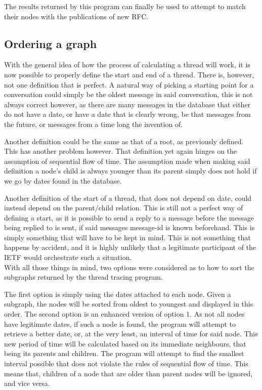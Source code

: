 \documentclass[a4paper,english]{report}
\begin{document}
The results returned by this program can finally be used to attempt to match their nodes with the publications of new RFC.\\

\subsection{Ordering a graph}

With the general idea of how the process of calculating a thread will work, it is now possible to properly define the start and end of a thread. There is, however, not one definition that is perfect. A natural way of picking a starting point for a conversation could simply be the oldest message in said conversation, this is not always correct however, as there are many messages in the database that either do not have a date, or have a date that is clearly wrong, be that messages from the future, or messages from a time long the invention of.

Another definition could be the same as that of a root, as previously defined. This has another problem however. That definition yet again hinges on the assumption of sequential flow of time. The assumption made when making said definition a node's child is always younger than its parent simply does not hold if we go by dates found in the database.

Another definition of the start of a thread, that does not depend on date, could instead depend on the parent/child relation. This is still not a perfect way of defining a start, as it is possible to send a reply to a message before the message being replied to is sent, if said messages message-id is known beforehand. This is simply something that will have to be kept in mind. This is not something that happens by accident, and it is highly unlikely that a legitimate participant of the IETF would orchestrate such a situation.\\


With all those things in mind, two options were considered as to how to sort the subgraphs returned by the thread tracing program. 

The first option is simply using the dates attached to each node. Given a subgraph, the nodes will be sorted from oldest to youngest and displayed in this order.
The second option is an enhanced version of option 1. As not all nodes have legitimate dates, if such a node is found, the program will attempt to retrieve a better date, or, at the very least, an interval of time for said node. This new period of time will be calculated based on its immediate neighbours, that being its parents and children. The program will attempt to find the smallest interval possible that does not violate the rules of sequential flow of time. This means that, children of a node that are older than parent nodes will be ignored, and vice versa.
\end{document}
